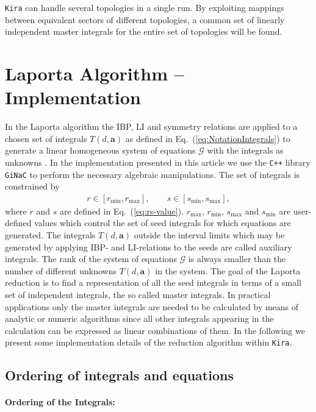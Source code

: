 \documentclass[a4paper,12pt]{scrartcl}
\newcommand*{\bm}{\boldsymbol}
\newcommand*{\kira}{\texttt{Kira}}
\newcommand*{\cplusplus}{\texttt{C++}}
\newcommand*{\ginac}{\texttt{GiNaC}}
\newcommand*{\CG}{\mathcal{G}}
\def\Eq#1{{Eq.~(\ref{#1})}}
\begin{document}
\kira{} can handle several topologies in a single run. By exploiting mappings
between equivalent sectors of different topologies, a common set of linearly
independent master integrals for the entire set of topologies will be found.

\section{Laporta Algorithm -- Implementation}
\label{implementation}

In the Laporta algorithm the IBP, LI and symmetry relations are applied to a
chosen set of integrals $T(d,\bm{a})$ as defined in \Eq{eq:NotationIntegrals} to
generate a linear homogeneous system of equations $\CG$ with the integrals as
unknowns \cite{Laporta:2001dd}. In the implementation presented in this article
we use the \cplusplus{} library \ginac{} \cite{Bauer:2000cp,Vollinga:2005pk} to
perform the necessary algebraic manipulations. The set of integrals is
constrained by
\begin{align}
  r\in[r_{\min},r_{\max}],\qquad s\in[s_{\min},s_{\max}],
  \label{eq:rs}
\end{align}
where $r$ and $s$ are defined in \Eq{eq:rs-value}.
$r_{\max}$, $r_{\min}$, $s_{\max}$ and $s_{\min}$ are user-defined values which
control the set of seed integrals for which equations are generated. The
integrals $T(d,\bm{a})$ outside the interval limits which may be generated by
applying IBP- and LI-relations to the seeds are called auxiliary integrals.  The
rank of the system of equations $\CG$ is always smaller than the number of
different unknowns $T(d,\bm{a})$ in the system.  The goal of the Laporta
reduction is to find a representation of all the seed integrals in terms of a
small set of independent integrals, the so called master integrals. In practical
applications only the master integrals are needed to be calculated by means of
analytic or numeric algorithms since all other integrals appearing in the
calculation can be expressed as linear combinations of them. In the following we
present some implementation details of the reduction algorithm within \kira{}.

\subsection{Ordering of integrals and equations}
\label{ordering}

\paragraph{Ordering of the Integrals:}
\end{document}
